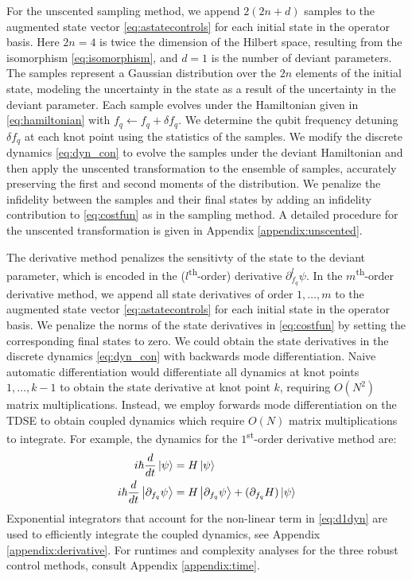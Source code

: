 For the unscented sampling method, we append $2(2n + d)$ samples
to the augmented state vector \eqref{eq:astatecontrols}
for each initial state in the operator basis. Here $2n = 4$ is twice the
dimension of the Hilbert space, resulting from the isomorphism \eqref{eq:isomorphism},
and $d = 1$ is the number of deviant parameters. The samples
represent a Gaussian distribution over the $2n$
elements of the initial state, modeling
the uncertainty in the state as a result of the uncertainty in
the deviant parameter. Each sample evolves under the Hamiltonian
given in \eqref{eq:hamiltonian} with $f_{q} \gets f_{q} + \delta f_{q}$.
We determine the qubit frequency detuning $\delta f_{q}$
at each knot point using the statistics of the samples.
We modify the discrete dynamics \eqref{eq:dyn_con} to
evolve the samples under the deviant Hamiltonian
and then apply the unscented transformation to the ensemble
of samples,
accurately preserving the first and second moments
of the distribution.
We penalize the infidelity between the samples and their final states
by adding an infidelity contribution to \eqref{eq:costfun}
as in the sampling method.
A detailed procedure for the unscented transformation is given
in Appendix \ref{appendix:unscented}.

The derivative method penalizes the sensitivty of the state
to the deviant parameter, which is encoded in the ($l$\textsuperscript{th}-order)
derivative $\partial_{f_{q}}^{l} \psi$. In the $m$\textsuperscript{th}-order
derivative method, we append all state derivatives of order $1, \dots, m$
to the augmented state vector \eqref{eq:astatecontrols}
for each initial state in the operator basis.
We penalize the norms of the state derivatives
in \eqref{eq:costfun} by setting the corresponding final states to zero.
We could obtain the state derivatives in the discrete dynamics \eqref{eq:dyn_con}
with backwards mode differentiation.
Naive automatic differentiation 
would differentiate all dynamics at knot points
$1, \dots, k - 1$ to obtain the state derivative at knot point $k$, requiring
$O(N^{2})$ matrix multiplications. Instead, we 
employ forwards mode differentiation on the TDSE to obtain coupled dynamics
which require $O(N)$ matrix multiplications to integrate.
For example, the dynamics for the $1$\textsuperscript{st}-order derivative method are:
\begin{align}
  i \hbar \frac{d}{dt} \ket{\psi} &= H \ket{\psi}\\
  i \hbar \frac{d}{dt} \ket{\partial_{f_{q}}\psi} &=
  H \ket{\partial_{f_{q}} \psi} +
  (\partial_{f_{q}} H) \ket{\psi}
  \label{eq:d1dyn}
\end{align}
Exponential integrators that account for the non-linear
term in \eqref{eq:d1dyn} are used to efficiently integrate the coupled dynamics,
see Appendix \ref{appendix:derivative}. For runtimes
and complexity analyses for the three robust control methods,
consult Appendix \ref{appendix:time}. 

